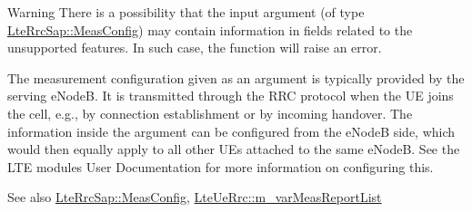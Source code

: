 \begin{DoxyWarning}{Warning}
There is a possibility that the input argument (of type \hyperlink{structns3_1_1LteRrcSap_1_1MeasConfig}{Lte\+Rrc\+Sap\+::\+Meas\+Config}) may contain information in fields related to the unsupported features. In such case, the function will raise an error.
\end{DoxyWarning}
The measurement configuration given as an argument is typically provided by the serving e\+NodeB. It is transmitted through the R\+RC protocol when the UE joins the cell, e.\+g., by connection establishment or by incoming handover. The information inside the argument can be configured from the e\+NodeB side, which would then equally apply to all other U\+Es attached to the same e\+NodeB. See the L\+TE module\textquotesingle{}s User Documentation for more information on configuring this.

\begin{DoxySeeAlso}{See also}
\hyperlink{structns3_1_1LteRrcSap_1_1MeasConfig}{Lte\+Rrc\+Sap\+::\+Meas\+Config}, \hyperlink{classns3_1_1LteUeRrc_a82da3c138c967761910c02b83724a0e4}{Lte\+Ue\+Rrc\+::m\+\_\+var\+Meas\+Report\+List} 
\end{DoxySeeAlso}

